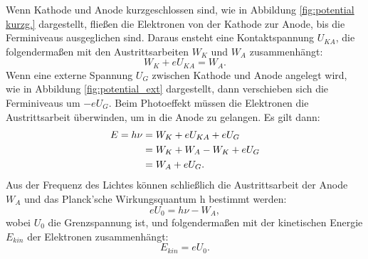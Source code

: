 Wenn Kathode und Anode kurzgeschlossen sind, wie in Abbildung \ref{fig:potential kurzg.} dargestellt, fließen die Elektronen von der Kathode zur Anode, bis die Ferminiveaus ausgeglichen sind. Daraus ensteht eine Kontaktspannung $U_{KA}$, die folgendermaßen mit den Austrittsarbeiten $W_K$ und $W_A$ zusammenhängt:
\begin{equation}
    W_K + eU_{KA} = W_A.
\end{equation}
Wenn eine externe Spannung $U_G$ zwischen Kathode und Anode angelegt wird, wie in Abbildung \ref{fig:potential_ext} dargestellt, dann verschieben sich die Ferminiveaus um $-eU_G$.
Beim Photoeffekt müssen die Elektronen die Austrittsarbeit  überwinden, um in die Anode zu gelangen. Es gilt dann:
\begin{align}
    E = h\nu &= W_K + eU_{KA} + eU_{G} \notag \\
             &= W_K + W_A - W_K + eU_{G} \notag \\
             &= W_A + eU_{G}.
\end{align}
Aus der Frequenz des Lichtes können 
schließlich
die Austrittsarbeit der Anode $W_A$ und 
das Planck’sche Wirkungsquantum h bestimmt 
werden:
\begin{equation}
    eU_{0} = h\nu - W_A, 
    \label{eq:photoelektrische Gleichung}
\end{equation}
wobei $U_0$ die Grenzspannung ist, und folgendermaßen mit der kinetischen Energie $E_{kin}$ der Elektronen zusammenhängt: 
\begin{equation}
  E_{kin} = eU_0.
\end{equation}


